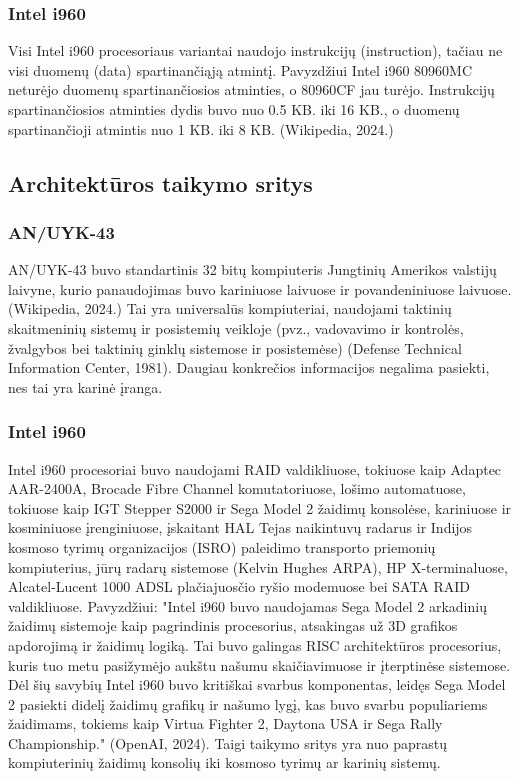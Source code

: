 \documentclass{article}
\begin{document}
\subsubsection{Intel i960}
Visi Intel i960 procesoriaus variantai naudojo instrukcijų (instruction), tačiau ne visi duomenų (data) spartinančiąją atmintį. Pavyzdžiui Intel i960 80960MC neturėjo duomenų spartinančiosios atminties, o 80960CF jau turėjo. Instrukcijų spartinančiosios atminties dydis buvo nuo 0.5 KB. iki 16 KB., o duomenų spartinančioji atmintis nuo 1 KB. iki 8 KB. (Wikipedia, 2024.)
\subsection{Architektūros taikymo sritys}
\subsubsection{AN/UYK-43}
AN/UYK-43 buvo standartinis 32 bitų kompiuteris Jungtinių Amerikos valstijų laivyne, kurio panaudojimas buvo kariniuose laivuose ir povandeniniuose laivuose. (Wikipedia, 2024.) Tai yra universalūs kompiuteriai, naudojami taktinių skaitmeninių sistemų ir posistemių veikloje (pvz., vadovavimo ir kontrolės, žvalgybos bei taktinių ginklų sistemose ir posistemėse) (Defense Technical Information Center, 1981). Daugiau konkrečios informacijos negalima pasiekti, nes tai yra karinė įranga.
\subsubsection{Intel i960}
Intel i960 procesoriai buvo naudojami RAID valdikliuose, tokiuose kaip Adaptec AAR-2400A, Brocade Fibre Channel komutatoriuose, lošimo automatuose, tokiuose kaip IGT Stepper S2000 ir Sega Model 2 žaidimų konsolėse, kariniuose ir kosminiuose įrenginiuose, įskaitant HAL Tejas naikintuvų radarus ir Indijos kosmoso tyrimų organizacijos (ISRO) paleidimo transporto priemonių kompiuterius, jūrų radarų sistemose (Kelvin Hughes ARPA), HP X-terminaluose, Alcatel-Lucent 1000 ADSL plačiajuosčio ryšio modemuose bei SATA RAID valdikliuose. Pavyzdžiui: "Intel i960 buvo naudojamas Sega Model 2 arkadinių žaidimų sistemoje kaip pagrindinis procesorius, atsakingas už 3D grafikos apdorojimą ir žaidimų logiką. Tai buvo galingas RISC architektūros procesorius, kuris tuo metu pasižymėjo aukštu našumu skaičiavimuose ir įterptinėse sistemose. Dėl šių savybių Intel i960 buvo kritiškai svarbus komponentas, leidęs Sega Model 2 pasiekti didelį žaidimų grafikų ir našumo lygį, kas buvo svarbu populiariems žaidimams, tokiems kaip Virtua Fighter 2, Daytona USA ir Sega Rally Championship." (OpenAI, 2024). Taigi taikymo sritys yra nuo paprastų kompiuterinių žaidimų konsolių iki kosmoso tyrimų ar karinių sistemų.
\end{document}
